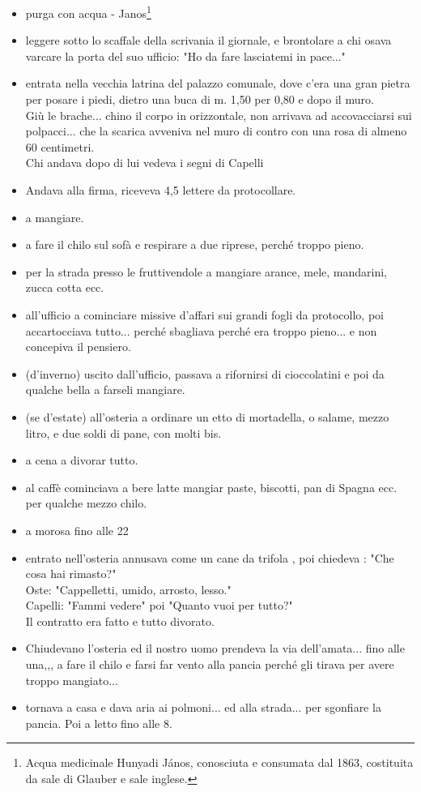 \begin{itemize}
\item[9.00]purga con acqua - Janos\footnote{Acqua medicinale Hunyadi János, conosciuta e consumata dal 1863, costituita da sale di Glauber e sale inglese.}
\item[10.00]leggere sotto lo scaffale della scrivania il giornale, e brontolare a chi osava varcare la porta del suo ufficio: "Ho da fare lasciatemi in pace..."
\item[11.00]entrata nella vecchia latrina del palazzo comunale, dove c'era una gran pietra per posare i piedi, dietro una buca di m. 1,50 per 0,80 e dopo il muro.\\
Giù le brache... chino il corpo in orizzontale, non arrivava ad accovacciarsi sui polpacci... che la scarica avveniva nel muro di contro con una rosa di almeno 60 centimetri. \\
Chi andava dopo di lui vedeva i segni di Capelli
\item[11.30]Andava alla firma, riceveva 4,5 lettere da protocollare.
\item[12.00] a mangiare.
\item[13.00] a fare il chilo sul sofà e respirare a due riprese, perché troppo pieno.
\item[13.30] per la strada presso le fruttivendole a mangiare arance, mele, mandarini, zucca cotta ecc.
\item[14.00] all'ufficio a cominciare missive d'affari sui grandi fogli da protocollo, poi accartocciava tutto... perché sbagliava perché era troppo pieno... e non concepiva il pensiero.
\item[17.00] (d'inverno) uscito dall'ufficio, passava a rifornirsi di cioccolatini e poi da qualche bella a farseli mangiare.
\item[18.00](se d'estate) all'osteria a ordinare un etto di mortadella, o salame, mezzo litro, e due soldi di pane, con molti bis.
\item[19 - 20] a cena a divorar tutto.
\item[20.30] al caffè cominciava a bere latte mangiar paste, biscotti, pan di Spagna ecc. per qualche mezzo chilo.
\item[21.30] a morosa fino alle 22
\item[22.00] entrato nell'osteria annusava come un cane da trifola , poi chiedeva : "Che cosa hai rimasto?"\\
Oste: "Cappelletti, umido, arrosto, lesso."\\
Capelli: "Fammi vedere" poi "Quanto vuoi per tutto?"	\\ Il contratto era fatto e tutto divorato.
\item[23.00] Chiudevano l'osteria ed il nostro uomo prendeva la via dell'amata... fino alle una,,, a fare il chilo e farsi far vento alla pancia perché gli tirava per avere troppo mangiato...
\item[1.00] tornava a casa e dava aria ai polmoni... ed alla strada... per sgonfiare la pancia. Poi a letto fino alle 8.
\end{itemize}
